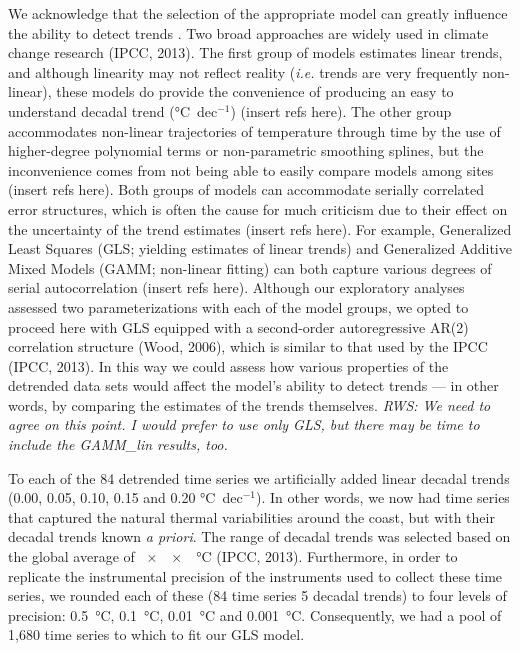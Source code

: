 \documentclass{ametsoc}
\begin{document}
We acknowledge that the selection of the appropriate model can greatly influence the ability to detect trends \citet{Franzke2012}. Two broad approaches are widely used in climate change research (IPCC, 2013). The first group of models estimates linear trends, and although linearity may not reflect reality (\emph{i.e.} trends are very frequently non-linear), these models do provide the convenience of producing an easy to understand decadal trend (\si{\degreeCelsius}~dec$^{-1}$) (insert refs here). The other group accommodates non-linear trajectories of temperature through time by the use of higher-degree polynomial terms or non-parametric smoothing splines, but the inconvenience comes from not being able to easily compare models among sites (insert refs here). Both groups of models can accommodate serially correlated error structures, which is often the cause for much criticism due to their effect on the uncertainty of the trend estimates (insert refs here). For example, Generalized Least Squares (GLS; yielding estimates of linear trends) and Generalized Additive Mixed Models (GAMM; non-linear fitting) can both capture various degrees of serial autocorrelation (insert refs here). Although our exploratory analyses assessed two parameterizations with each of the model groups, we opted to proceed here with GLS equipped with a second-order autoregressive AR(2) correlation structure (Wood, 2006), which is similar to that used by the IPCC (IPCC, 2013). In this way we could assess how various properties of the detrended data sets would affect the model’s ability to detect trends --- in other words, by comparing the estimates of the trends themselves. \emph{RWS: We need to agree on this point. I would prefer to use only GLS, but there may be time to include the GAMM_lin results, too.}

To each of the 84 detrended time series we artificially added linear decadal trends (0.00, 0.05, 0.10, 0.15 and 0.20 \si{\degreeCelsius}~dec$^{-1}$). In other words, we now had time series that captured the natural thermal variabilities around the coast, but with their decadal trends known \emph{a priori}. The range of decadal trends was selected based on the global average of \SI{xx}{\degreeCelsius} (IPCC, 2013). Furthermore, in order to replicate the instrumental precision of the instruments used to collect these time series, we rounded each of these (84 time series \texttimes{} 5 decadal trends) to four levels of precision: \SI{0.5}{\degreeCelsius}, \SI{0.1}{\degreeCelsius}, \SI{0.01}{\degreeCelsius} and \SI{0.001}{\degreeCelsius}. Consequently, we had a pool of 1,680 time series to which to fit our GLS model.
\end{document}
